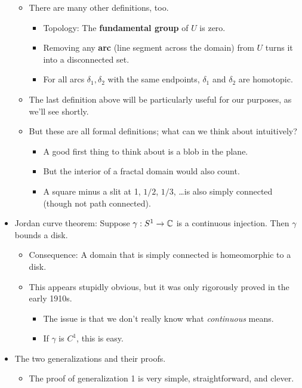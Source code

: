 \documentclass[../notes.tex]{subfiles}
\begin{document}
\begin{itemize}
    \begin{itemize}
        \item There are many other definitions, too.
        \begin{itemize}
            \item Topology: The \textbf{fundamental group} of $U$ is zero.
            \item Removing any \textbf{arc} (line segment across the domain) from $U$ turns it into a disconnected set.
            \item For all arcs $\delta_1,\delta_2$ with the same endpoints, $\delta_1$ and $\delta_2$ are homotopic.
        \end{itemize}
        \item The last definition above will be particularly useful for our purposes, as we'll see shortly.
        \item But these are all formal definitions; what can we think about intuitively?
        \begin{itemize}
            \item A good first thing to think about is a blob in the plane.
            \item But the interior of a fractal domain would also count.
            \item A square minus a slit at 1, $1/2$, $1/3$, \dots is also simply connected (though not path connected).
        \end{itemize}
    \end{itemize}
    \item Jordan curve theorem: Suppose $\gamma:S^1\to\mathbb{C}$ is a continuous injection. Then $\gamma$ bounds a disk.
    \begin{itemize}
        \item Consequence: A domain that is simply connected is homeomorphic to a disk.
        \item This appears stupidly obvious, but it was only rigorously proved in the early 1910s.
        \begin{itemize}
            \item The issue is that we don't really know what \emph{continuous} means.
            \item If $\gamma$ is $C^1$, this is easy.
        \end{itemize}
    \end{itemize}
    \item The two generalizations and their proofs.
    \begin{itemize}
        \item The proof of generalization 1 is very simple, straightforward, and clever.

\end{itemize}
\end{itemize}
\end{document}
